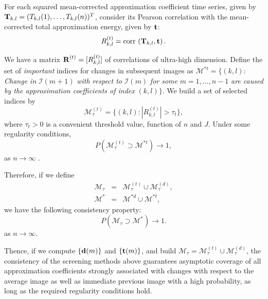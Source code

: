 \documentclass[journal]{IEEEtran}
\def\corr{\mbox{{\rm corr\,}}}
\newcommand{\vd}{{\textbf d}}
\newcommand{\vR}{{\textbf R}}
\newcommand{\vT}{{\textbf T}}
\newcommand{\vt}{{\textbf t}}
\begin{document}
For each squared mean-corrected approximation coefficient time series, given by $\vT_{k,l} = (T_{k,l}(1),\ldots,T_{k,l}(n))^T$, consider its Pearson correlation with the mean-corrected total approximation energy, given by $\vt$:
\begin{equation}
R_{k,l}^{(t)}= \corr\left( \vT_{k,l}, \vt\right).
\label{def_Rklt}
\end{equation}

We have a matrix $\vR^{(t)}=[R_{k,l}^{(t)}]$ of correlations of ultra-high dimension. Define the set of 
{\it important} indices for changes in subsequent images as $\mathcal{M}^{*t}=\{(k,l):$ \textit{Change in }$\mathcal{I}(m+1)$ \textit{with respect to }$\mathcal{I}(m)$ \textit{ for some }$m=1,\ldots,n-1$\textit{ are caused by the approximation coefficients of index }$(k,l)\}$. We build a set of selected indices by
\[
\mathcal{M}_{\tau}^{(t)}=\{(k,l):|R_{k,l}^{(t)}|>\tau_t\},
\] 
where $\tau_t>0$ is a convenient threshold value, function of $n$ and $J$. Under some regularity conditions,
\[
P(\mathcal{M}_{\tau}^{(t)}\supset\mathcal{M}^{*t})\rightarrow 1,
\]
as $n\rightarrow\infty$ \cite{fan2020statistical}.

Therefore, if we define
\begin{eqnarray}
\mathcal{M}_{\tau}&=&\mathcal{M}_{\tau}^{(t)}\cup\mathcal{M}_{\tau}^{(d)},\label{def_Mpop}\\
\mathcal{M}^{*}&=& \mathcal{M}^{*d}\cup\mathcal{M}^{*t}\label{def_Memp},
\end{eqnarray}
we have the following consistency property:
\[
P(\mathcal{M}_{\tau}\supset\mathcal{M}^{*})\rightarrow 1.
\]
as $n\rightarrow\infty$.

Thence, if we compute $\{\vd(m)\}$ and $\{\vt(m)\}$, and build $\mathcal{M}_{\tau}=\mathcal{M}_{\tau}^{(t)}\cup\mathcal{M}_{\tau}^{(d)}$, the consistency of the screening methods above guarantees asymptotic coverage of all approximation coefficients strongly associated with changes with respect to the average image as well as immediate previous image with a high probability, as long as the required regularity conditions hold. 
\end{document}
